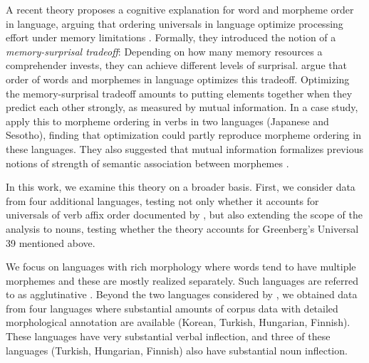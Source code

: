 \documentclass[11pt,letterpaper]{article}
\newcommand{\citep}{\parencite}
\newcommand{\citet}{\Textcite}
\begin{document}
A recent theory proposes a cognitive explanation for word and morpheme order in language, arguing that ordering universals in language optimize processing effort under memory limitations \citep{Hahn2020modeling}.
Formally, they introduced the notion of a \emph{memory-surprisal tradeoff}: Depending on how many memory resources a comprehender invests, they can achieve different levels of surprisal.
\citet{Hahn2020modeling} argue that order of words and morphemes in language optimizes this tradeoff.
Optimizing the memory-surprisal tradeoff amounts to putting elements together when they predict each other strongly, as measured by mutual information.
In a case study, \citet{Hahn2020modeling} apply this to morpheme ordering in verbs in two languages (Japanese and Sesotho), finding that optimization could partly reproduce morpheme ordering in these languages.
They also suggested that mutual information formalizes previous notions of strength of semantic association between morphemes \citep{bybee-morphology-1985}. %






In this work, we examine this theory on a broader basis.
First, we consider data from four additional languages, testing not only whether it accounts for universals of verb affix order documented by \cite{bybee-morphology-1985}, but also extending the scope of the analysis to nouns, testing whether the theory accounts for Greenberg's Universal 39 mentioned above.

We focus on languages with rich morphology where words tend to have multiple morphemes and these are mostly realized separately.
Such languages are referred to as agglutinative \citep{humboldt1836uber,greenberg1960a}.
Beyond the two languages considered by \citet{Hahn2020modeling}, we obtained data from four languages where substantial amounts of corpus data with detailed morphological annotation are available (Korean, Turkish, Hungarian, Finnish).
These languages have very substantial verbal inflection, and three of these languages (Turkish, Hungarian, Finnish) also have substantial noun inflection.


\end{document}
